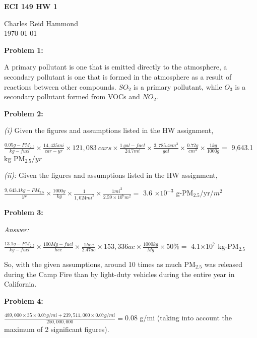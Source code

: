 \documentclass[10pt]{article}
\begin{document}
    \begin{center} 
        \large\textbf{ECI 149 HW 1}

        \normalsize Charles Reid Hammond \\ \today

    \end{center} 

    \setlength{\parskip}{\baselineskip}

    \begin{flushleft}

        \textbf{Problem 1:} 
        
        A primary pollutant is one that is emitted directly to the atmosphere, a secondary pollutant is one that is formed in the atmosphere as a result of reactions between other compounds. $SO_2$ is a primary pollutant, while $O_3$ is a secondary pollutant formed from VOCs and $NO_2$.

        \hrulefill

        \textbf{Problem 2:} 
        
        \textit{(i)} Given the figures and assumptions listed in the HW assignment,

        $\frac{0.05 g-PM_{2.5}}{kg-fuel}\times\frac{14,435 mi}{car-yr}\times121,083\:cars\times\frac{1 \:gal-fuel}{24.7mi}\times\frac{3,785.4 cm^3}{gal}\times\frac{0.72 g}{cm^3}\times\frac{1kg}{1000g}=$ 9,643.1 kg PM$_{2.5}/yr$


        \textit{(ii):} Given the figures and assumptions listed in the HW assignment,

        $\frac{9,643.1 kg-PM_{2.5}}{yr}\times\frac{1000g}{kg}\times\frac{1}{1,024mi^2}\times\frac{1mi^2}{2.59\times10^6 m^2}=$ 3.6 $\times 10^{-3}$ g-PM$_{2.5}$/yr/$m^2$

\hrulefill


        \textbf{Problem 3:}


        \textit{Answer:} 
        
        $\frac{13.1 g-PM_{2.5}}{kg-fuel}\times\frac{100Mg-fuel}{hec}\times\frac{1 hec}{2.47 ac}\times153,336ac \times\frac{1000kg}{Mg}\times 50\%=$ 4.1$\times 10^7$ kg-PM$_{2.5}$

        So, with the given assumptions, around 10 times as much PM$_{2.5}$ was released during the Camp Fire than by light-duty vehicles during the entire year in California.

        \hrulefill

        \textbf{Problem 4:}

        $\frac{489,000\times35\times0.07g/mi+239,511,000\times0.07g/mi}{250,000,000}=$0.08 g/mi (taking into account the maximum of 2 significant figures).


\end{flushleft}
\end{document}
